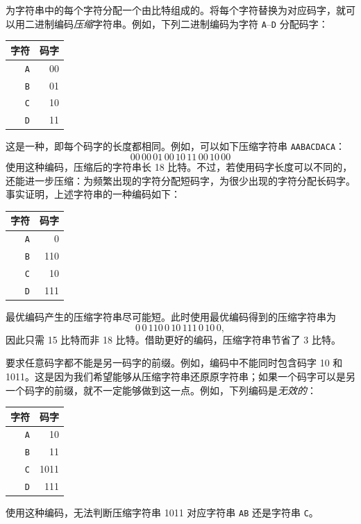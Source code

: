 为字符串中的每个字符分配一个由比特组成的。将每个字符替换为对应码字，就可以用二进制编码\emph{压缩}字符串。例如，下列二进制编码为字符 \texttt{A}--\texttt{D} 分配码字：
\begin{center}
\begin{tabular}{rr}
字符 & 码字 \\
\hline
\texttt{A} & 00 \\
\texttt{B} & 01 \\
\texttt{C} & 10 \\
\texttt{D} & 11 \\
\end{tabular}
\end{center}
这是一种，即每个码字的长度都相同。例如，可以如下压缩字符串 \texttt{AABACDACA}：
\[00\,00\,01\,00\,10\,11\,00\,10\,00\]
使用这种编码，压缩后的字符串长 18 比特。不过，若使用码字长度可以不同的，还能进一步压缩：为频繁出现的字符分配短码字，为很少出现的字符分配长码字。事实证明，上述字符串的一种编码如下：
\begin{center}
\begin{tabular}{rr}
字符 & 码字 \\
\hline
\texttt{A} & 0 \\
\texttt{B} & 110 \\
\texttt{C} & 10 \\
\texttt{D} & 111 \\
\end{tabular}
\end{center}
最优编码产生的压缩字符串尽可能短。此时使用最优编码得到的压缩字符串为
\[0\,0\,110\,0\,10\,111\,0\,10\,0,\]
因此只需 15 比特而非 18 比特。借助更好的编码，压缩字符串节省了 3 比特。

要求任意码字都不能是另一码字的前缀。例如，编码中不能同时包含码字 10 和 1011。这是因为我们希望能够从压缩字符串还原原字符串；如果一个码字可以是另一个码字的前缀，就不一定能够做到这一点。例如，下列编码是\emph{无效的}：
\begin{center}
\begin{tabular}{rr}
字符 & 码字 \\
\hline
\texttt{A} & 10 \\
\texttt{B} & 11 \\
\texttt{C} & 1011 \\
\texttt{D} & 111 \\
\end{tabular}
\end{center}
使用这种编码，无法判断压缩字符串 1011 对应字符串 \texttt{AB} 还是字符串 \texttt{C}。

